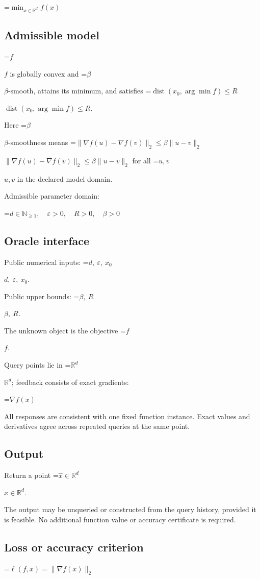 \documentclass[10pt,a4paper]{article}
\newcommand{\AtlasMath}[1]{\par\begingroup\centering\setbox0=\hbox{$\displaystyle #1$}\ifdim\wd0>1.4\linewidth\typeout{ATLAS WIDE FORMULA: \the\wd0}\fi\ifdim\wd0>\linewidth\resizebox{\linewidth}{!}{\box0}\else\box0\fi\par\endgroup}
\newcommand{\AtlasInlineMath}[1]{\begingroup\setbox0=\hbox{$#1$}\ifdim\wd0>.4\linewidth\endgroup\AtlasMath{#1}\else\endgroup$#1$\fi}
\begin{document}
\AtlasMath{\min_{x\in \mathbb{R}^d}f(x)}


\subsection{Admissible model}
\AtlasInlineMath{f} is globally convex and \AtlasInlineMath{\beta}-smooth, attains its minimum, and satisfies \AtlasInlineMath{\operatorname{dist}(x_0,\arg\min f)\le R}.

Here \AtlasInlineMath{\beta}-smoothness means \AtlasInlineMath{\|\nabla f(u)-\nabla f(v)\|_2\le\beta\|u-v\|_2} for all \AtlasInlineMath{u,v} in the declared model domain.

Admissible parameter domain:


\AtlasMath{d\in\mathbb{N}_{\ge1},\quad \varepsilon>0,\quad R>0,\quad \beta>0}


\subsection{Oracle interface}
Public numerical inputs: \AtlasInlineMath{d,\ \varepsilon,\ x_0}.

Public upper bounds: \AtlasInlineMath{\beta,\ R}.

The unknown object is the objective \AtlasInlineMath{f}.

Query points lie in \AtlasInlineMath{\mathbb{R}^d}; feedback consists of exact gradients:


\AtlasMath{\nabla f(x)}


All responses are consistent with one fixed function instance. Exact values and derivatives agree across repeated queries at the same point.

\subsection{Output}
Return a point \AtlasInlineMath{\widehat x\in\mathbb R^d}.

The output may be unqueried or constructed from the query history, provided it is feasible. No additional function value or accuracy certificate is required.

\subsection{Loss or accuracy criterion}

\AtlasMath{\ell(f,x)=\|\nabla f(x)\|_2}
\end{document}
